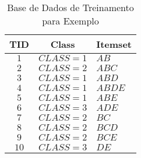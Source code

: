 \begin{table}[htbp]
	\centering
		\begin{tabular}{|c|c|l|}
		\hline
		\textbf{TID}	& \textbf{Class}	& \textbf{Itemset}	\\
		\hline
		$1$		& $CLASS=1$		& $AB$			\\
		\hline
		$2$		& $CLASS=2$		& $ABC$			\\
		\hline
		$3$		& $CLASS=1$		& $ABD$			\\
		\hline
		$4$		& $CLASS=1$		& $ABDE$		\\
		\hline
		$5$		& $CLASS=1$		& $ABE$			\\
		\hline
		$6$		& $CLASS=3$		& $ADE$			\\
		\hline
		$7$		& $CLASS=2$		& $BC$			\\
		\hline
		$8$		& $CLASS=2$		& $BCD$			\\
		\hline
		$9$		& $CLASS=2$		& $BCE$			\\
		\hline
		$10$		& $CLASS=3$		& $DE$			\\
		\hline
		\end{tabular}
	\caption{Base de Dados de Treinamento para Exemplo}
	\label{tab:example_training_db}
\end{table}
